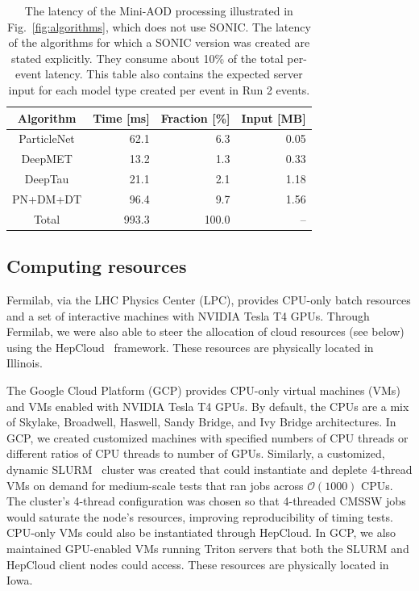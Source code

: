 \begin{table}[ht!]
\begin{center}
\begin{tabular}{c r r r}
 Algorithm & \multicolumn{1}{c}{Time [ms]} & \multicolumn{1}{c}{Fraction [\%]} & \multicolumn{1}{c}{Input [MB]}\\ %
 \hline
 ParticleNet & 62.1 & 6.3 & 0.05 \\
 DeepMET & 13.2 & 1.3 & 0.33 \\
 DeepTau & 21.1 & 2.1 & 1.18 \\
 \hline
 PN+DM+DT & 96.4 & 9.7 & 1.56 \\ 
 \hline
 Total & 993.3 & 100.0 & -- \\ 
\end{tabular}
\caption{The latency of the Mini-AOD processing illustrated in Fig.~\ref{fig:algorithms}, which does not use SONIC. The latency of the algorithms for which a SONIC version was created are stated explicitly. They consume about 10\% of the total per-event latency. This table also contains the expected server input for each model type created per event in Run 2 \ttbar events.}
\label{table:SONIC_Algos}
\end{center}
\end{table}

\subsection{Computing resources}

Fermilab, via the LHC Physics Center (LPC), provides CPU-only batch resources and a set of interactive machines with NVIDIA Tesla T4 GPUs. Through Fermilab, we were also able to steer the allocation of cloud resources (see below) using the HepCloud~\cite{Holzman:2017jgg} framework. These resources are physically located in Illinois.

The Google Cloud Platform (GCP) provides CPU-only virtual machines (VMs) and VMs enabled with NVIDIA Tesla T4 GPUs. By default, the CPUs are a mix of Skylake, Broadwell, Haswell, Sandy Bridge, and Ivy Bridge architectures. In GCP, we created customized machines with specified numbers of CPU threads or different ratios of CPU threads to number of GPUs. Similarly, a customized, dynamic SLURM~\cite{slurm} cluster was created that could instantiate and deplete 4-thread VMs on demand for medium-scale tests that ran jobs across $\mathcal{O}(1000)$ CPUs. The cluster's 4-thread configuration was chosen so that 4-threaded CMSSW jobs would saturate the node's resources, improving reproducibility of timing tests. CPU-only VMs could also be instantiated through HepCloud. In GCP, we also maintained GPU-enabled VMs running Triton servers that both the SLURM and HepCloud client nodes could access. These resources are physically located in Iowa.

